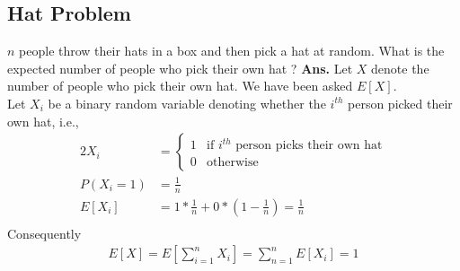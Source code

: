 \documentclass[11pt, a4paper]{article}
\begin{document}
    \subsection{Hat Problem}
    $n$ people throw their hats in a box and then pick a hat at random. What is the expected number of people who pick their own hat ?\newline \newline
    \textbf{Ans.} Let $X$ denote the number of people who pick their own hat. We have been asked $E[X]$.\\
    Let $X_{i}$ be a binary random variable denoting whether the $i^{th}$ person picked their own hat, i.e.,
    \begin{alignat*}{2}
        X_{i} &= \begin{cases} 1 &\mbox{if $i^{th}$ person picks their own hat}\\ 
                                0 &\mbox{otherwise} \end{cases} \\
        P(X_{i} = 1) &= \frac{1}{n} \\
        E[X_{i}] &= 1 * \frac{1}{n} + 0 * (1 - \frac{1}{n}) = \frac{1}{n}\\
    \end{alignat*}
    Consequently
    \begin{align*}
        E[X] = E[\sum_{i=1}^{n} X_{i}] = \sum_{n=1}^{n}E[X_{i}] = 1
    \end{align*}
\end{document}
